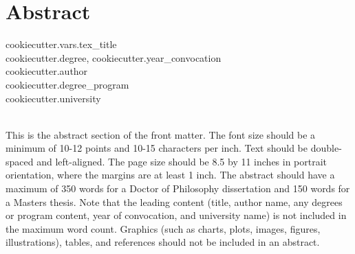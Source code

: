

\chapter*{Abstract} \label{abstract}

{\centering
	{{cookiecutter.vars.tex_title}} \\
	{{cookiecutter.degree}}, {{cookiecutter.year_convocation}} \\
	{{cookiecutter.author}} \\
	{{cookiecutter.degree_program}} \\
	{{cookiecutter.university}} \\ ~ \\
}

This is the abstract section of the front matter. The font size should be a minimum of 10-12 points and 10-15 characters per inch. Text should be double-spaced and left-aligned. The page size should be 8.5 by 11 inches in portrait orientation, where the margins are at least 1 inch. The abstract should have a maximum of 350 words for a Doctor of Philosophy dissertation and 150 words for a Masters thesis. Note that the leading content (title, author name, any degrees or program content, year of convocation, and university name) is not included in the maximum word count. Graphics (such as charts, plots, images, figures, illustrations), tables, and references should not be included in an abstract. 
